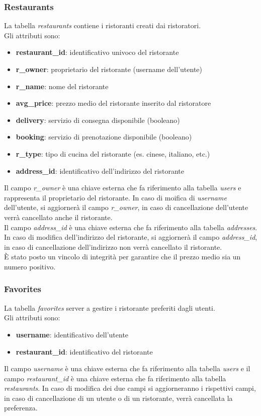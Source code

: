 \subsubsection{Restaurants}
La tabella \textit{restaurants} contiene i ristoranti creati 
dai ristoratori.\\
Gli attributi sono:
\begin{itemize}
    \item \textbf{restaurant\_id}: identificativo univoco del ristorante
    \item \textbf{r\_owner}: proprietario del ristorante (username dell'utente)
    \item \textbf{r\_name}: nome del ristorante
    \item \textbf{avg\_price}: prezzo medio del ristorante inserito dal ristoratore
    \item \textbf{delivery}: servizio di consegna disponibile (booleano)
    \item \textbf{booking}: servizio di prenotazione disponibile (booleano)
    \item \textbf{r\_type}: tipo di cucina del ristorante (es. cinese, italiano, etc.)
    \item \textbf{address\_id}: identificativo dell'indirizzo del ristorante
\end{itemize}
Il campo \textit{r\_owner} è una chiave esterna che fa riferimento
alla tabella \textit{users} e rappresenta il proprietario del ristorante.
In caso di moifica di \textit{username} dell'utente, si aggiornerà
il campo \textit{r\_owner}, in caso di cancellazione dell'utente 
verrà cancellato anche il ristorante.\\
Il campo \textit{address\_id} è una chiave esterna che fa riferimento
alla tabella \textit{addresses}.
In caso di modifica dell'indirizzo del ristorante, si aggiornerà
il campo \textit{address\_id}, in caso di cancellazione dell'indirizzo
non verrà cancellato il ristorante.\\
\`E stato posto un vincolo di integrità per garantire che il
prezzo medio sia un numero positivo.

\subsubsection{Favorites}
La tabella \textit{favorites} server a gestire i 
ristorante preferiti dagli utenti.\\
Gli attributi sono:
\begin{itemize}
    \item \textbf{username}: identificativo dell'utente
    \item \textbf{restaurant\_id}: identificativo del ristorante
\end{itemize}
Il campo \textit{username} è una chiave esterna che fa riferimento
alla tabella \textit{users} e il campo \textit{restaurant\_id} 
è una chiave esterna che fa riferimento
alla tabella \textit{restaurants}. In caso di modifica dei due campi
si aggiorneranno i rispettivi campi, in caso di cancellazione
di un utente o di un ristorante, verrà cancellata la preferenza.

